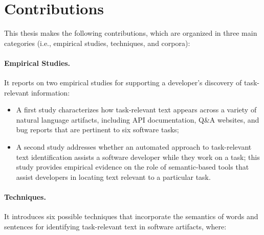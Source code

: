 

\section{Contributions}
\label{cp1:contributions}

This thesis makes the following contributions, 
which are organized 
in three main categories
(i.e., empirical studies, techniques, and corpora):








\paragraph{\textbf{Empirical Studies.}} 

It reports on two empirical studies for supporting a developer's discovery of task-relevant information:

\begin{itemize}

    \item A first study characterizes how task-relevant text appears across a variety of natural language artifacts, including  API documentation, Q\&A websites, and
    bug reports that are pertinent to six software tasks; 

    \item A second study addresses whether 
    an automated approach to task-relevant text identification assists a software developer while they work on a task; this study provides empirical evidence on the role of semantic-based tools that assist developers in locating 
    text relevant to a particular task.
\end{itemize}




\paragraph{\textbf{Techniques.}} 

It introduces six possible techniques that incorporate the semantics of words and sentences for identifying task-relevant text in software artifacts, where:
    
